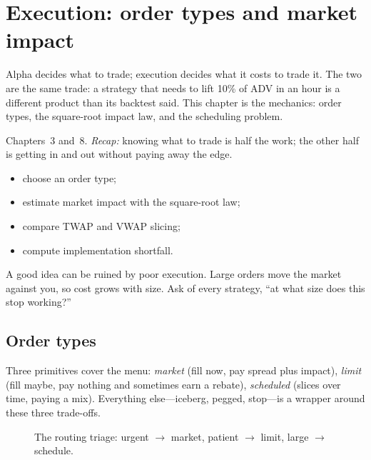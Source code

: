 \chapter{Execution: order types and market impact}\label{ch:exec}

\noindent Alpha decides what to trade; execution decides what it costs to trade it. The
two are the same trade: a strategy that needs to lift 10\% of ADV in an hour is a
different product than its backtest said. This chapter is the mechanics: order types,
the square-root impact law, and the scheduling problem.

\begin{rulebox}
Chapters~3 and~8. \emph{Recap:} knowing what to trade is half the work; the other half is getting in and out without paying away the edge.
\end{rulebox}
\begin{wins}
\begin{itemize}
\item choose an order type;
\item estimate market impact with the square-root law;
\item compare TWAP and VWAP slicing;
\item compute implementation shortfall.
\end{itemize}
\end{wins}
\begin{principle}
A good idea can be ruined by poor execution. Large orders move the market against you, so cost grows with size. Ask of every strategy, ``at what size does this stop working?''
\end{principle}

\section{Order types}\label{sec:ordtypes}

Three primitives cover the menu: \emph{market} (fill now, pay spread plus impact),
\emph{limit} (fill maybe, pay nothing and sometimes earn a rebate), \emph{scheduled}
(slices over time, paying a mix). Everything else---iceberg, pegged, stop---is a wrapper
around these three trade-offs.

\begin{figure}[htbp]\centering

\caption{The routing triage: urgent $\to$ market, patient $\to$ limit, large $\to$ schedule.}
\label{fig:orders}
\end{figure}

